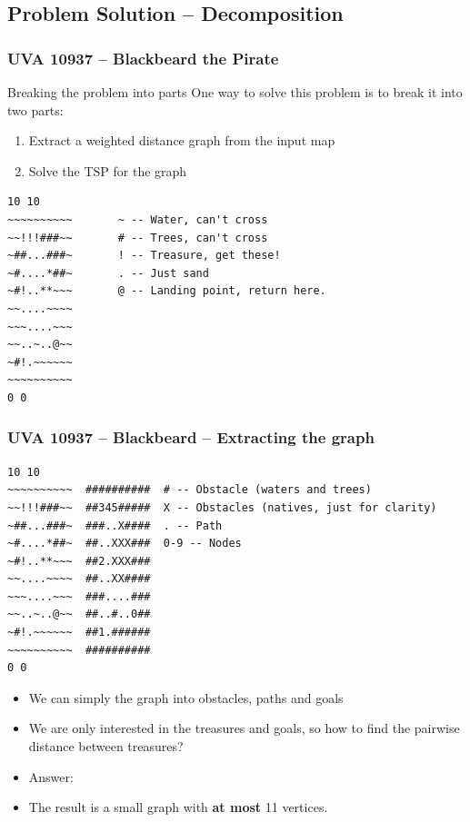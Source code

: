 \documentclass{beamer}
\begin{document}
\subsection{Problem Solution -- Decomposition}
\begin{frame}[fragile]
  \frametitle{UVA 10937 -- Blackbeard the Pirate}

  {\smaller

    \begin{block}{Breaking the problem into parts}
      One way to solve this problem is to break it into two parts:
      \begin{enumerate}
      \item Extract a weighted distance graph from the input map
      \item Solve the TSP for the graph
      \end{enumerate}
    \end{block}

\begin{verbatim}
10 10
~~~~~~~~~~       ~ -- Water, can't cross
~~!!!###~~       # -- Trees, can't cross
~##...###~       ! -- Treasure, get these!
~#....*##~       . -- Just sand
~#!..**~~~       @ -- Landing point, return here.
~~....~~~~
~~~....~~~       
~~..~..@~~       
~#!.~~~~~~
~~~~~~~~~~
0 0
\end{verbatim}
  }
\end{frame}

\begin{frame}[fragile]
  \frametitle{UVA 10937 -- Blackbeard -- Extracting the graph}

  {\smaller
\begin{verbatim}
10 10
~~~~~~~~~~  ##########  # -- Obstacle (waters and trees)
~~!!!###~~  ##345#####  X -- Obstacles (natives, just for clarity)
~##...###~  ###..X####  . -- Path
~#....*##~  ##..XXX###  0-9 -- Nodes
~#!..**~~~  ##2.XXX###  
~~....~~~~  ##..XX####
~~~....~~~  ###....###     
~~..~..@~~  ##..#..0##     
~#!.~~~~~~  ##1.######
~~~~~~~~~~  ##########
0 0
\end{verbatim}

\begin{itemize}
\item We can simply the graph into obstacles, paths and goals
\item We are only interested in the treasures and goals, so how to find the
  pairwise distance between treasures?
\item \alert{Answer}: 
\item The result is a small graph with {\bf at most} 11 vertices.
\end{itemize}

  }
\end{frame}
\end{document}
